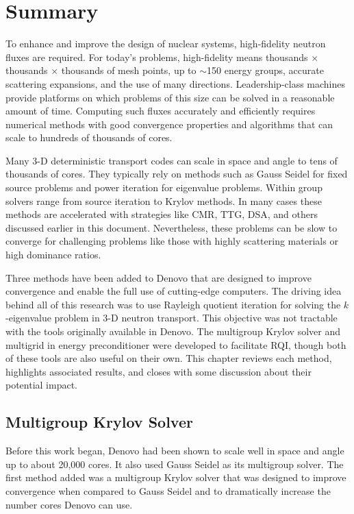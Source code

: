 
\chapter{Summary}
\label{sec:Chp5}
To enhance and improve the design of nuclear systems, high-fidelity neutron fluxes are required. For today's problems, high-fidelity  means thousands $\times$ thousands $\times$ thousands of mesh points, up to $\sim$150 energy groups, accurate scattering expansions, and the use of many directions. Leadership-class machines provide platforms on which problems of this size can be solved in a reasonable amount of time. Computing such fluxes accurately and efficiently requires numerical methods with good convergence properties and algorithms that can scale to hundreds of thousands of cores. 

Many 3-D deterministic transport codes can scale in space and angle to tens of thousands of cores. They typically rely on methods such as Gauss Seidel for fixed source problems and power iteration for eigenvalue problems. Within group solvers range from source iteration to Krylov methods. In many cases these methods are accelerated with strategies like CMR, TTG, DSA, and others discussed earlier in this document. Nevertheless, these problems can be slow to converge for challenging problems like those with highly scattering materials or high dominance ratios. 

Three methods have been added to Denovo that are designed to improve convergence and enable the full use of cutting-edge computers. The driving idea behind all of this research was to use Rayleigh quotient iteration for solving the $k$-eigenvalue problem in 3-D neutron transport. This objective was not tractable with the tools originally available in Denovo. The multigroup Krylov solver and multigrid in energy preconditioner were developed to facilitate RQI, though both of these tools are also useful on their own. This chapter reviews each method, highlights associated results, and closes with some discussion about their potential impact. 

\section{Multigroup Krylov Solver}
Before this work began, Denovo had been shown to scale well in space and angle up to about 20,000 cores. It also used Gauss Seidel as its multigroup solver. The first method added was a multigroup Krylov solver that was designed to improve convergence when compared to Gauss Seidel and to dramatically increase the number cores Denovo can use. 

